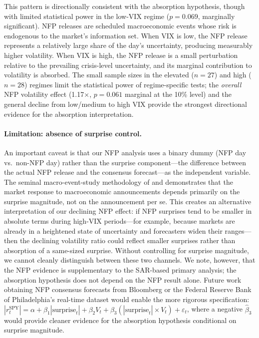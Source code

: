\documentclass[12pt,a4paper]{article}
\begin{document}
This pattern is directionally consistent with the absorption hypothesis, though with limited statistical power in the low-VIX regime ($p = 0.069$, marginally significant). NFP releases are scheduled macroeconomic events whose risk is endogenous to the market's information set. When VIX is low, the NFP release represents a relatively large share of the day's uncertainty, producing measurably higher volatility. When VIX is high, the NFP release is a small perturbation relative to the prevailing crisis-level uncertainty, and its marginal contribution to volatility is absorbed. The small sample sizes in the elevated ($n = 27$) and high ($n = 28$) regimes limit the statistical power of regime-specific tests; the \textit{overall} NFP volatility effect (1.17$\times$, $p = 0.061$ marginal at the 10\% level) and the general decline from low/medium to high VIX provide the strongest directional evidence for the absorption interpretation.

\paragraph{Limitation: absence of surprise control.} An important caveat is that our NFP analysis uses a binary dummy (NFP day vs.\ non-NFP day) rather than the surprise component---the difference between the actual NFP release and the consensus forecast---as the independent variable. The seminal macro-event-study methodology of \citet{andersen2003} and \citet{balduzzi2001} demonstrates that the market response to macroeconomic announcements depends primarily on the surprise magnitude, not on the announcement per se. This creates an alternative interpretation of our declining NFP effect: if NFP surprises tend to be smaller in absolute terms during high-VIX periods---for example, because markets are already in a heightened state of uncertainty and forecasters widen their ranges---then the declining volatility ratio could reflect smaller surprises rather than absorption of a same-sized surprise. Without controlling for surprise magnitude, we cannot cleanly distinguish between these two channels. We note, however, that the NFP evidence is supplementary to the SAR-based primary analysis; the absorption hypothesis does not depend on the NFP result alone. Future work obtaining NFP consensus forecasts from Bloomberg or the Federal Reserve Bank of Philadelphia's real-time dataset would enable the more rigorous specification: $|r_t^{\text{SPY}}| = \alpha + \beta_1 |\text{surprise}_t| + \beta_2 V_t + \beta_3 (|\text{surprise}_t| \times V_t) + \varepsilon_t$, where a negative $\hat{\beta}_3$ would provide cleaner evidence for the absorption hypothesis conditional on surprise magnitude.
\end{document}
